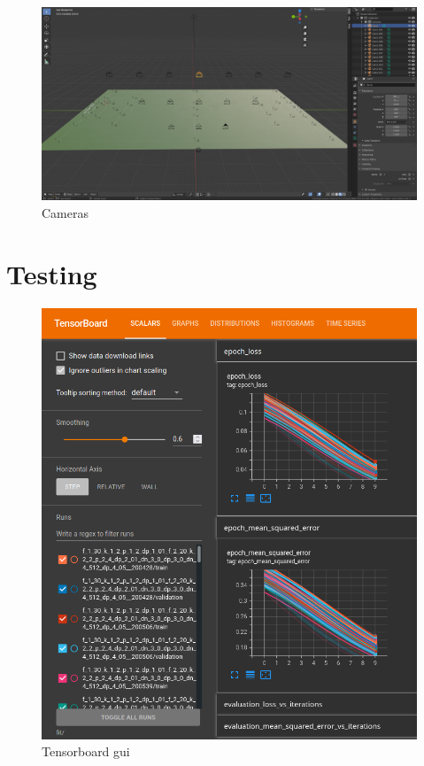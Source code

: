 \documentclass[
    11pt,
    oneside
]{report}
\begin{document}
\begin{appendices}
\begin{figure}[H]
    \includegraphics[keepaspectratio, width=\columnwidth]{Screenshot_2022-03-05_12-05-23.png}
    \caption{Cameras}
    \label{img:cameras}
\end{figure}

\section{Testing}

\begin{figure}[H]
    \includegraphics[keepaspectratio, width=\columnwidth]{Screenshot_2022-04-17_23-06-29.png}
    \caption{Tensorboard gui}
    \label{img:tensorboard_gui}
\end{figure}




\end{appendices}
\end{document}
